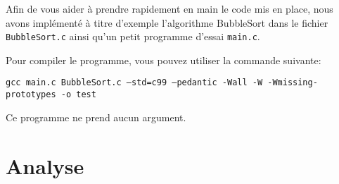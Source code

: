 \documentclass[a4paper,10pt]{article}
\begin{document}
Afin de vous aider à prendre rapidement en main le code mis en place, nous avons
implémenté à titre d'exemple l'algorithme BubbleSort dans le fichier
\texttt{BubbleSort.c} ainsi qu'un petit programme d'essai \texttt{main.c}.

Pour compiler le programme, vous pouvez utiliser la commande suivante:

{\small \texttt{gcc main.c BubbleSort.c --std=c99 --pedantic -Wall -W -Wmissing-prototypes -o test}}

Ce programme ne prend aucun argument.





\section{Analyse}
\end{document}
